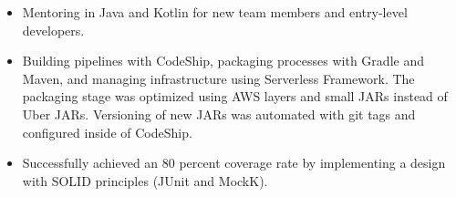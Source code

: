 \documentclass[letterpaper]{twentysecondcv} %
\begin{document}
\begin{twenty}
{        \begin{itemize}
            \item Mentoring in Java and Kotlin for new team members and entry-level developers.
        \end{itemize}
         
        \begin{itemize}
            \item Building pipelines with CodeShip, packaging processes with Gradle and Maven, and managing infrastructure using Serverless Framework. The packaging stage was optimized using AWS layers and small JARs instead of Uber JARs. Versioning of new JARs was automated with git tags and configured inside of CodeShip.
        \end{itemize}

        \begin{itemize}
            \item Successfully achieved an 80 percent coverage rate by implementing a design with SOLID principles (JUnit and MockK).
        \end{itemize}


    }
    \\



\end{twenty}


\setNextPageGeometry{1cm}{2cm}{1cm}{0.1cm}
\end{document}
